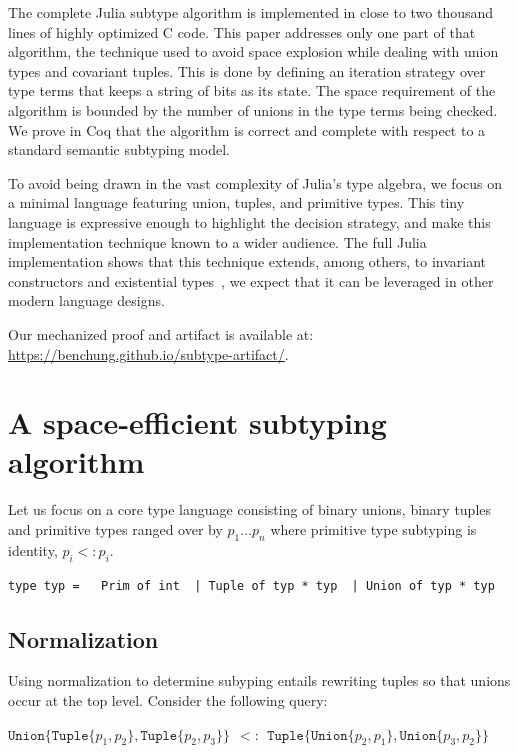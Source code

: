 \documentclass[a4paper,english]{lipics-v2019}
\newcommand{\xt}[1]{\texttt{#1}}
\newcommand{\union}[2]{\xt{Union\{}#1,#2\xt{\}}}
\newcommand{\tuple}[1]{\xt{Tuple\{}#1\xt{\}}}
\begin{document}
The complete Julia subtype algorithm is implemented in close to two thousand
lines of highly optimized C code. This paper addresses only one part of that
algorithm, the technique used to avoid space explosion while dealing with
union types and covariant tuples. This is done by defining an iteration
strategy over type terms that keeps a string of bits as its state. The space
requirement of the algorithm is bounded by the number of unions in the type
terms being checked. We prove in Coq that the algorithm is correct and
complete with respect to a standard semantic subtyping model.

To avoid being drawn in the vast complexity of Julia's type algebra, we
focus on a minimal language featuring union, tuples, and primitive
types. This tiny language is expressive enough to highlight the decision
strategy, and make this implementation technique known to a wider audience.
The full Julia implementation shows that this technique extends, among
others, to invariant constructors and existential
types~\cite{DBLP:NardelliBPCBV18}, we expect that it can be leveraged in
other modern language designs.

\medskip
Our mechanized proof and artifact is available at: \url{https://benchung.github.io/subtype-artifact/}.
\newpage

\section{A space-efficient subtyping algorithm}

Let us focus on a core type language consisting of binary unions, binary
tuples and primitive types ranged over by $p_1 \dots p_n$ where primitive
type subtyping is identity, $p_i <: p_i$.

\medskip
\begin{lstlisting}
type typ =   Prim of int  | Tuple of typ * typ  | Union of typ * typ
\end{lstlisting}
\medskip

\subsection{Normalization}\label{normalize}

Using normalization to determine subyping entails rewriting tuples so that
unions occur at the top level. Consider the following query:

\medskip
$\union{ \tuple{p_1,p_2}}{\tuple{p_2,p_3}} ~~ <:~~  \tuple{ \union{p_2}{p_1}, \union{p_3}{p_2}}$
\medskip
\end{document}
